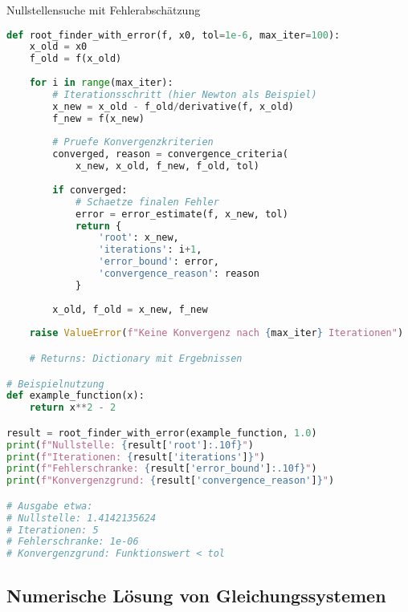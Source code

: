 \begin{examplecode}{Nullstellensuche mit Fehlerabschätzung} 
\begin{lstlisting}[language=Python, style=basesmol]
def root_finder_with_error(f, x0, tol=1e-6, max_iter=100):
    x_old = x0
    f_old = f(x_old)
    
    for i in range(max_iter):
        # Iterationsschritt (hier Newton als Beispiel)
        x_new = x_old - f_old/derivative(f, x_old)
        f_new = f(x_new)
        
        # Pruefe Konvergenzkriterien
        converged, reason = convergence_criteria(
            x_new, x_old, f_new, f_old, tol)
            
        if converged:
            # Schaetze finalen Fehler
            error = error_estimate(f, x_new, tol)
            return {
                'root': x_new,
                'iterations': i+1,
                'error_bound': error,
                'convergence_reason': reason
            }
            
        x_old, f_old = x_new, f_new
        
    raise ValueError(f"Keine Konvergenz nach {max_iter} Iterationen")

    # Returns: Dictionary mit Ergebnissen

# Beispielnutzung
def example_function(x):
    return x**2 - 2

result = root_finder_with_error(example_function, 1.0)
print(f"Nullstelle: {result['root']:.10f}")
print(f"Iterationen: {result['iterations']}")
print(f"Fehlerschranke: {result['error_bound']:.10f}")
print(f"Konvergenzgrund: {result['convergence_reason']}")

# Ausgabe etwa:
# Nullstelle: 1.4142135624
# Iterationen: 5
# Fehlerschranke: 1e-06
# Konvergenzgrund: Funktionswert < tol

\end{lstlisting}
\end{examplecode}

\subsection{Numerische Lösung von Gleichungssystemen}

